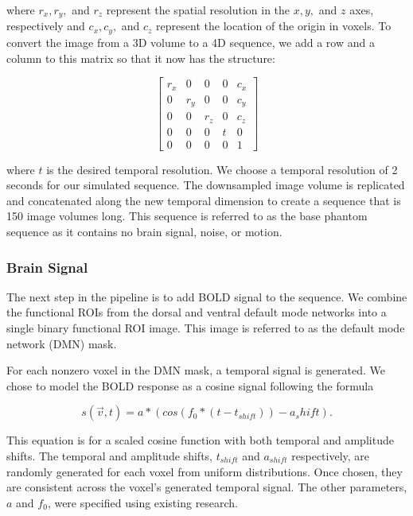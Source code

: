 \noindent where $r_x, r_y,$ and $r_z$ represent the spatial resolution in the $x, y,$ and $z$ axes, respectively and $c_x, c_y,$ and $c_z$ represent the location of the origin in voxels. To convert the image from a 3D volume to a 4D sequence, we add a row and a column to this matrix so that it now has the structure:

\begin{equation}
\begin{bmatrix}
 r_x &  0   &  0   & 0 & c_x\\ 
 0   &  r_y &  0   & 0 & c_y \\ 
 0   &  0   &  r_z & 0 & c_z \\ 
 0   &  0   &  0   & t & 0 \\
 0   &  0   &  0   & 0 & 1 
\end{bmatrix}
\end{equation}

\noindent where $t$ is the desired temporal resolution. We choose a temporal resolution of 2 seconds for our simulated sequence. The downsampled image volume is replicated and concatenated along the new temporal dimension to create a sequence that is 150 image volumes long. This sequence is referred to as the base phantom sequence as it contains no brain signal, noise, or motion.

\subsubsection{Brain Signal}

The next step in the pipeline is to add BOLD signal to the sequence. 
We combine the functional ROIs from the dorsal and ventral default mode networks into a single binary functional ROI image. This image is referred to as the default mode network (DMN) mask. 

For each nonzero voxel in the DMN mask, a temporal signal is generated. We chose to model the BOLD response as a cosine signal following the formula

\begin{equation}
s(\vec{v}, t) = a*(cos(f_0 * (t-t_{shift})) - a_shift).
\label{ch5:bold_eq}
\end{equation}

\noindent This equation is for a scaled cosine function with both temporal and amplitude shifts. The temporal and amplitude shifts, $t_{shift}$ and $a_{shift}$ respectively, are randomly generated for each voxel from uniform distributions. Once chosen, they are consistent across the voxel's generated temporal signal. The other parameters, $a$ and $f_0$, were specified using existing research. 

